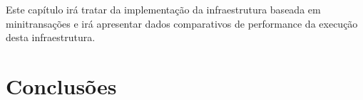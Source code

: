 \documentclass[11pt,twoside,a4paper]{book}
\renewcommand{\chaptermark}[1]{\markboth{\MakeUppercase{#1}}{}}
\begin{document}
Este capítulo irá tratar da implementação da infraestrutura baseada em minitransações e irá apresentar dados comparativos de performance da execução desta infraestrutura.

\chapter{Conclusões}
\label{chap:conclusoes}

\renewcommand{\chaptermark}[1]{\markboth{\MakeUppercase{\appendixname\ \thechapter}} {\MakeUppercase{#1}} }
\fancyhead[RE,LO]{}
\appendix

% 

\backmatter \singlespacing   %

\end{document}
